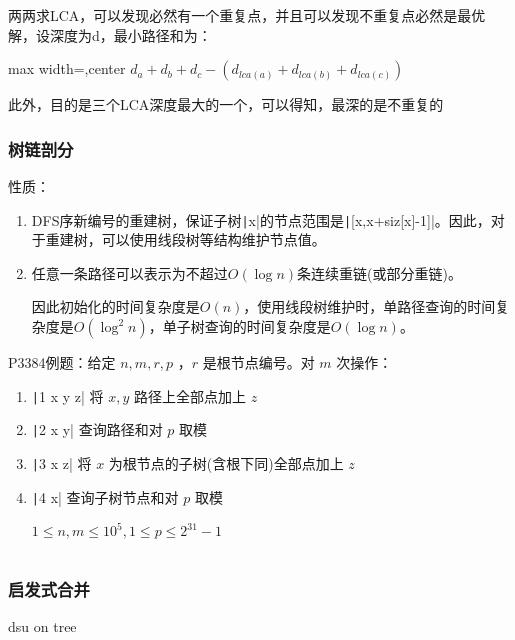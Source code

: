 \documentclass[twocolumn,10pt]{ctexart}
\newcommand{\Omicron}{O}
\begin{document}
两两求LCA，可以发现必然有一个重复点，并且可以发现不重复点必然是最优解，设深度为d，最小路径和为：

\begin{adjustbox}{max width=\linewidth,center}
$d_a+d_b+d_c-(d_{lca(a)}+d_{lca(b)}+d_{lca(c)})$
\end{adjustbox}

此外，目的是三个LCA深度最大的一个，可以得知，最深的是不重复的

\subsubsection{树链剖分}

性质：

\begin{enumerate}
\item DFS序新编号的重建树，保证子树\texttt|x|的节点范围是\texttt|[x,x+siz[x]-1]|。因此，对于重建树，可以使用线段树等结构维护节点值。
\item 任意一条路径可以表示为不超过$\Omicron(\log n)$条连续重链(或部分重链)。

因此初始化的时间复杂度是$\Omicron(n)$，使用线段树维护时，单路径查询的时间复杂度是$\Omicron(\log^2n)$，单子树查询的时间复杂度是$\Omicron(\log n)$。
\end{enumerate}

\begin{notebox}
P3384例题：给定 $n,m,r,p$ ，$r$ 是根节点编号。对 $m$ 次操作：

\begin{enumerate}
\item \texttt|1 x y z| 将 $x,y$ 路径上全部点加上 $z$
\item \texttt|2 x y| 查询路径和对 $p$ 取模
\item \texttt|3 x z| 将 $x$ 为根节点的子树(含根下同)全部点加上 $z$
\item \texttt|4 x| 查询子树节点和对 $p$ 取模

$1\le n,\allowbreak{}m\le10^5,\allowbreak{}1\le p\le2^{31}-1$
\end{enumerate}
\end{notebox}

\inputminted{cpp}{code/p3384_treelink_split.cpp}

\subsubsection{启发式合并}

dsu on tree
\end{document}
